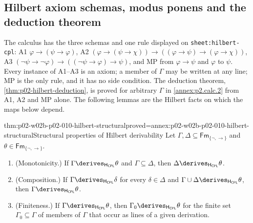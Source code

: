 \subsection{Hilbert axiom schemas, modus ponens and the deduction theorem}
\label{sec:p02-w02b-p02-010-hilbert}

The calculus has the three schemas and one rule displayed on
\texttt{sheet:\allowbreak hilbert-cpl}: A1
\(\varphi\to(\psi\to\varphi)\), A2
\((\varphi\to(\psi\to\chi))\to((\varphi\to\psi)\to(\varphi\to\chi))\), A3
\((\neg\psi\to\neg\varphi)\to((\neg\psi\to\varphi)\to\psi)\), and MP from
\(\varphi\to\psi\) and \(\varphi\) to \(\psi\).  Every instance of A1--A3 is
an axiom; a member of \(\Gamma\) may be written at any line; MP is the only
rule, and it has no side condition.  The deduction theorem,
\cref{thm:p02-hilbert-deduction}, is proved for arbitrary \(\Gamma\) in
\cref{annex:p2.calc.2} from A1, A2 and MP alone.  The following lemmas are
the Hilbert facts on which the maps below depend.

\begin{hblemma}{thm:p02-w02b-p02-010-hilbert-structural}{proved=annex:p02-w02b-p02-010-hilbert-structural}{Structural properties of Hilbert derivability}
Let \(\Gamma,\Delta\subseteq\mathsf{Fm}_{\{\neg,\to\}}\) and
\(\theta\in\mathsf{Fm}_{\{\neg,\to\}}\).
\begin{enumerate}
  \item (Monotonicity.) If \(\Gamma\derives_{\mathsf H_{\mathsf{CPL}}}\theta\)
    and \(\Gamma\subseteq\Delta\), then
    \(\Delta\derives_{\mathsf H_{\mathsf{CPL}}}\theta\).
  \item (Composition.) If \(\Gamma\derives_{\mathsf H_{\mathsf{CPL}}}\delta\)
    for every \(\delta\in\Delta\) and
    \(\Gamma\cup\Delta\derives_{\mathsf H_{\mathsf{CPL}}}\theta\), then
    \(\Gamma\derives_{\mathsf H_{\mathsf{CPL}}}\theta\).
  \item (Finiteness.) If \(\Gamma\derives_{\mathsf H_{\mathsf{CPL}}}\theta\),
    then \(\Gamma_0\derives_{\mathsf H_{\mathsf{CPL}}}\theta\) for the finite
    set \(\Gamma_0\subseteq\Gamma\) of members of \(\Gamma\) that occur as
    lines of a given derivation.
\end{enumerate}
\end{hblemma}

